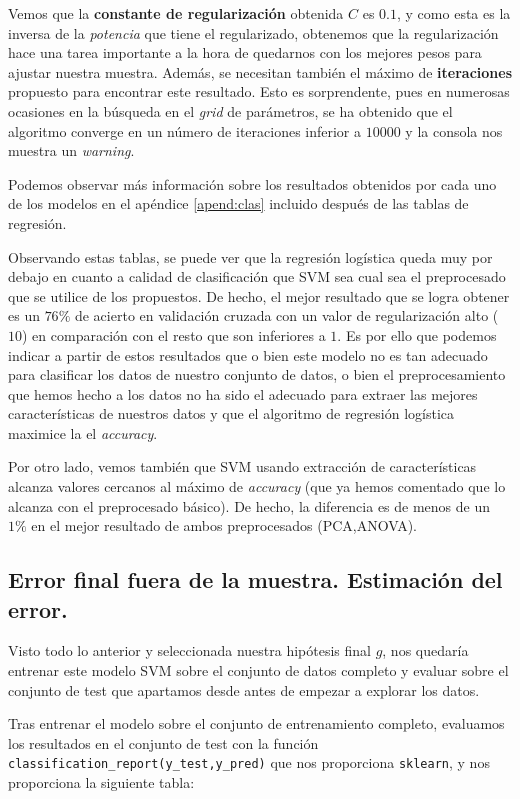 \documentclass[a4paper, 20pt]{article}
\begin{document}
Vemos que la \textbf{constante de regularización} obtenida $C$ es $0.1$, y como esta es la inversa de la \emph{potencia} que tiene el regularizado, obtenemos que la regularización hace una tarea importante a la hora de quedarnos con los mejores pesos para ajustar nuestra muestra. Además, se necesitan también el máximo de \textbf{iteraciones} propuesto para encontrar este resultado. Esto es sorprendente, pues en numerosas ocasiones en la búsqueda en el \emph{grid} de parámetros, se ha obtenido que el algoritmo converge en un número de iteraciones inferior a $10000$ y la consola nos muestra un \emph{warning}.


Podemos observar más información sobre los resultados obtenidos por cada uno de los modelos en el apéndice \ref{apend:clas} incluido después de las tablas de regresión.

Observando estas tablas, se puede ver que la regresión logística queda muy por debajo en cuanto a calidad de clasificación que SVM sea cual sea el preprocesado que se utilice de los propuestos. De hecho, el mejor resultado que se logra obtener es un $76\%$ de acierto en validación cruzada con un valor de regularización alto ($10$) en comparación con el resto que son inferiores a $1$. Es por ello que podemos indicar a partir de estos resultados que o bien este modelo no es tan adecuado para clasificar los datos de nuestro conjunto de datos, o bien el preprocesamiento que hemos hecho a los datos no ha sido el adecuado para extraer las mejores características de nuestros datos y que el algoritmo de regresión logística maximice la el \emph{accuracy}.

Por otro lado, vemos también que SVM usando extracción de características alcanza valores cercanos al máximo de \emph{accuracy} (que ya hemos comentado que lo alcanza con el preprocesado básico). De hecho, la diferencia es de menos de un $1\%$ en el mejor resultado de ambos preprocesados (PCA,ANOVA).



\subsection{Error final fuera de la muestra. Estimación del error.}

Visto todo lo anterior y seleccionada nuestra hipótesis final $g$, nos quedaría entrenar este modelo SVM sobre el conjunto de datos completo y evaluar sobre el conjunto de test que apartamos desde antes de empezar a explorar los datos.

Tras entrenar el modelo sobre el conjunto de entrenamiento completo, evaluamos los resultados en el conjunto de test con la función \lstinline{classification_report(y_test,y_pred)} que nos proporciona \lstinline{sklearn}, y nos proporciona la siguiente tabla:
\end{document}
